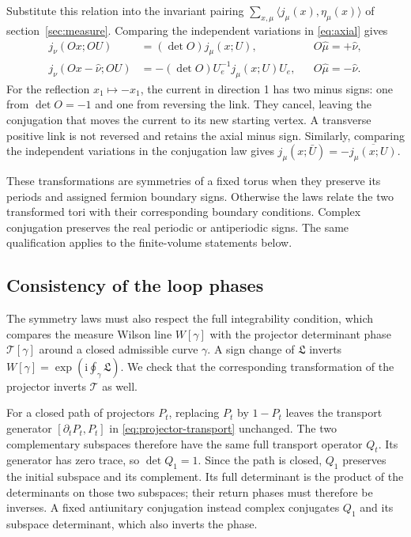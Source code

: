 \documentclass[11pt,a4paper]{article}
\theoremstyle{remark}
\newcommand{\ii}{\mathrm i}
\begin{document}
Substitute this relation into the invariant pairing
$\sum_{x,\mu}\langle j_\mu(x),\eta_\mu(x)\rangle$ of
section~\ref{sec:measure}. Comparing the independent variations in
\eqref{eq:axial} gives
\begin{equation}
\begin{aligned}
 j_\nu(Ox;OU)&=(\det O)j_\mu(x;U),
       &&O\hat\mu=+\hat\nu,\\
 j_\nu(Ox-\hat\nu;OU)&=-(\det O)U_e^{-1}j_\mu(x;U)U_e,
       &&O\hat\mu=-\hat\nu .
\end{aligned}
\label{eq:axial-components}
\end{equation}
For the reflection $x_1\mapsto-x_1$, the current in direction 1
has two minus signs: one from $\det O=-1$ and one from reversing
the link. They cancel, leaving the conjugation that moves the current
to its new starting vertex. A transverse positive link is not reversed
and retains the axial minus sign. Similarly, comparing the independent
variations in the conjugation law gives
$j_\mu(x;\bar U)=-\overline{j_\mu(x;U)}$.

These transformations are symmetries of a fixed torus when they preserve
its periods and assigned fermion boundary signs. Otherwise the laws
relate the two transformed tori with their corresponding boundary
conditions. Complex conjugation preserves the real periodic or
antiperiodic signs. The same qualification applies to the finite-volume
statements below.

\subsection{Consistency of the loop phases}

The symmetry laws must also respect the full integrability condition,
which compares the measure Wilson line $W[\gamma]$ with the projector
determinant phase $\mathcal T[\gamma]$ around a closed admissible
curve $\gamma$. A sign change of $\mathfrak L$ inverts
$W[\gamma]=\exp(\ii\oint_\gamma\mathfrak L)$. We check that
the corresponding transformation of the projector inverts $\mathcal T$
as well.

For a closed path of projectors $P_t$, replacing $P_t$ by $1-P_t$
leaves the transport generator $[\partial_tP_t,P_t]$ in
\eqref{eq:projector-transport} unchanged. The two complementary
subspaces therefore have the same full transport operator $Q_t$.
Its generator has zero trace, so $\det Q_1=1$. Since the path is
closed, $Q_1$ preserves the initial subspace and its complement.
Its full determinant is the product of the determinants on those two
subspaces; their return phases must therefore be inverses.
A fixed antiunitary conjugation instead complex conjugates $Q_1$
and its subspace determinant, which also inverts the phase.
\end{document}
